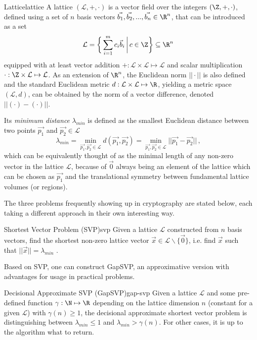 \newcommand{\lat}{\mathcal{L}}
\begin{definition}{Lattice}{lattice}
  A lattice $(\lat, +, \cdot)$ is a vector field over the integers $(\Z, +, \cdot)$, defined using a set of $n$ basis vectors $\vec{b_1}, \vec{b_2}, ..., \vec{b_n} \in \R^n$, that can be introduced as a set
  $$\lat = \bigg\{\sum_{i=1}^m c_i \vec{b}_i \,\bigg|\, c \in \Z\bigg\} \subseteq \R^n$$
  equipped with at least vector addition $+: \lat \times \lat \mapsto \lat$ and scalar multiplication $\cdot: \Z \times \lat \mapsto \lat$.
  As an extension of $\R^n$, the Euclidean norm $||\cdot||$ is also defined and the standard Euclidean metric $d: \lat \times \lat \mapsto \R$, yielding a metric space $(\lat, d)$, can be obtained by the norm of a vector difference, denoted $||(\cdot) - (\cdot)||$.
\end{definition}

Its \textit{minimum distance} $\lambda_{min}$ is defined as the smallest Euclidean distance between two points $\vec{p_1}$ and $\vec{p_2} \in \lat$
$$\lambda_{min} = \min_{\vec{p_1}, \vec{p_2} \in \lat} d(\vec{p_1}, \vec{p_2}) =
  \min_{\vec{p_1}, \vec{p_2} \in \lat} ||\vec{p_1} - \vec{p_2}|| \,,$$
which can be equivalently thought of as the minimal length of any non-zero vector in the lattice $\lat$, because of $\vec{0}$ always being an element of the lattice which can be chosen as $\vec{p_1}$ and the translational symmetry between fundamental lattice volumes (or regions).

The three problems frequently showing up in cryptography are stated below, each taking a different approach in their own interesting way.

\begin{definition}{Shortest Vector Problem (SVP)}{svp}
  Given a lattice $\lat$ constructed from $n$ basis vectors, find the shortest non-zero lattice vector $\vec{x} \in \lat \backslash \{\vec{0}\}$, i.e. find $\vec{x}$ such that $||\vec{x}|| = \lambda_{min}$ \parencite{2016-decade-of-lattice}.
\end{definition}

Based on SVP, one can construct GapSVP, an approximative version with advantages for usage in practical problems.

\begin{definition}{Decisional Approximate SVP (GapSVP)}{gap-svp}
  Given a lattice $\lat$ and some pre-defined function $\gamma: \N \mapsto \R$ depending on the lattice dimension $n$ (constant for a given $\lat$) with $\gamma(n) \geq 1$, the decisional approximate shortest vector problem is distinguishing between $\lambda_{min} \leq 1$ and $\lambda_{min} > \gamma(n)$.
  For other cases, it is up to the algorithm what to return.
\end{definition}

